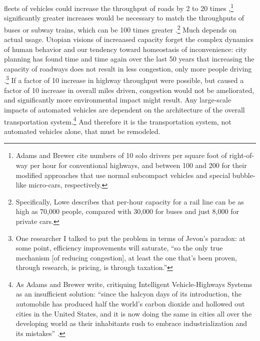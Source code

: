 fleets of vehicles could increase the throughput of roads by 2 to 20
times \cite[p. 229]{adamsBrewerRoadways},\footnote{Adams and Brewer
  cite numbers of 10 solo drivers per square foot of right-of-way per
  hour for conventional highways, and between 100 and 200 for their
  modified approaches that use normal subcompact vehicles and special
  bubble-like micro-cars, respectively.} significantly greater increases would be necessary to match the
throughputs of buses or subway trains, which can be 100 times
greater \cite[p. 222]{loweCars}.\footnote{Specifically, Lowe describes that
  per-hour capacity for 
  a rail line can be as high as 70,000 people, compared with 30,000 for buses
and just 8,000 for private cars.} Much depends on actual usage.
Utopian visions of increaased capacity forget the complex dynamics of human behavior and our
tendency toward homeostasis of inconvenience: city planning has found
time and time again over the last 50 years that increasing the
capacity of roadways does not result in less congestion, only more
people driving \cite[p. 219]{marshallFuture}.\footnote{One researcher I talked
to put the problem in terms of Jevon's paradox: at some point,
efficiency improvements will saturate, ``so the only true mechanism
[of reducing congestion],
at least the one that's been proven, through research, is pricing, is
through taxation.''} If a factor of 10
increase in highway throughput were possible, but caused a factor of
10 increase in overall miles driven, congestion would not be
ameliorated, and significantly more environmental impact might result. Any
large-scale impacts of automated vehicles are dependent on the
architecture of the overall transportation system.\footnote{As Adams
  and Brewer write, critiquing Intelligent Vehicle-Highways Systems as
  an insufficient solution: ``since the halcyon days of its introduction, the
  automobile has produced half the world's carbon dioxide and hollowed
out cities in the United States, and it is now doing the same in
cities all over the developing world as their inhabitants rush to
embrace industrialization and its mistakes'' \cite[p.
  227]{adamsBrewerRoadways}.} And therefore it is
the transportation system, not automated vehicles alone, that must be remodeled.



